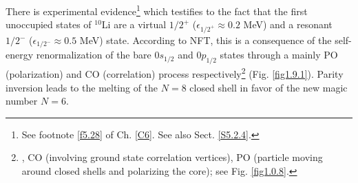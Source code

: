  
There is  experimental evidence\footnote{See footnote \ref{f5.28} of Ch. \ref{C6}. See also Sect. \ref{S5.2.4}.} which testifies to the fact that the first unoccupied states of $^{10}$Li are a virtual $1/2^+$ ($\epsilon_{1/2^+}\approx0.2$ MeV) and a resonant $1/2^-$ ($\epsilon_{1/2^-}\approx0.5$ MeV) state.   According to NFT, this is a consequence of the self-energy renormalization of the bare $0s_{1/2}$ and $0p_{1/2}$ states through a mainly PO (polarization) and CO (correlation) process respectively\footnote{\cite{Barranco:01,Barranco:20}, CO (involving ground state correlation vertices), PO (particle moving around closed shells and polarizing the core); see Fig. \ref{fig1.0.8}.} (Fig. \ref{fig1.9.1}).  Parity inversion leads to the melting of  the $N=8$ closed shell in favor of the new magic number $N=6$. 




